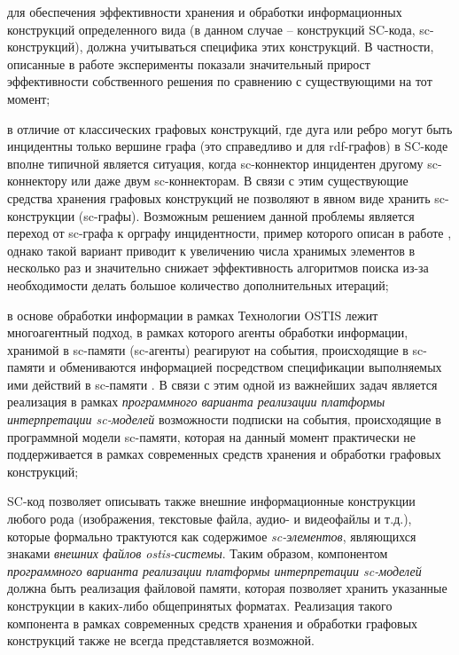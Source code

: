 \begin{scnitemize}
    \item для обеспечения эффективности хранения и обработки информационных конструкций определенного вида (в данном
    случае -- конструкций SC-кода, sc-конструкций), должна учитываться специфика этих конструкций. В частности,
    описанные в работе  эксперименты показали значительный прирост эффективности собственного
    решения по сравнению с существующими на тот момент;
    \item в отличие от классических графовых конструкций, где дуга или ребро могут быть инцидентны только вершине графа
    (это справедливо и для rdf-графов) в SC-коде вполне типичной является ситуация, когда sc-коннектор инцидентен
    другому sc-коннектору или даже двум sc-коннекторам. В связи с этим существующие средства хранения графовых
    конструкций не позволяют в явном виде хранить sc-конструкции (sc-графы). Возможным решением данной проблемы является
    переход от sc-графа к орграфу инцидентности, пример которого описан в работе , однако такой
    вариант приводит к увеличению числа хранимых элементов в несколько раз и значительно снижает эффективность алгоритмов
    поиска из-за необходимости делать большое количество дополнительных итераций;
    \item в основе обработки информации в рамках Технологии OSTIS лежит многоагентный подход, в рамках которого агенты
    обработки информации, хранимой в sc-памяти (sc-агенты) реагируют на события, происходящие в sc-памяти и обмениваются
    информацией посредством спецификации выполняемых ими действий в sc-памяти . В связи с этим
    одной из важнейших задач является реализация в рамках \textit{программного варианта реализации платформы
    интерпретации sc-моделей} возможности подписки на события, происходящие в программной модели sc-памяти, которая на
    данный момент практически не поддерживается в рамках современных средств хранения и обработки графовых конструкций;
    \item SC-код позволяет описывать также внешние информационные конструкции любого рода (изображения, текстовые файла,
    аудио- и видеофайлы и т.д.), которые формально трактуются как содержимое \textit{sc-элементов}, являющихся знаками
    \textit{внешних файлов ostis-системы}. Таким образом, компонентом \textit{программного варианта реализации платформы
    интерпретации sc-моделей} должна быть реализация файловой памяти, которая позволяет хранить указанные конструкции в
    каких-либо общепринятых форматах. Реализация такого компонента в рамках современных средств хранения и обработки
    графовых конструкций также не всегда представляется возможной.
\end{scnitemize}

